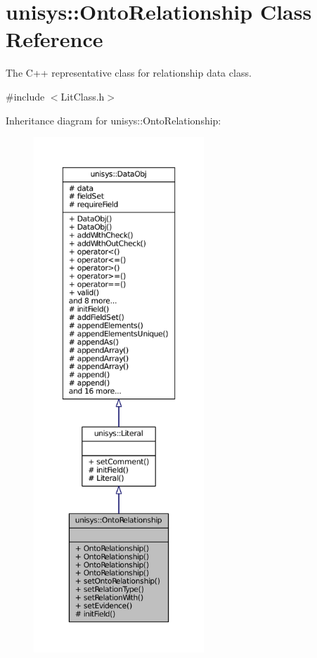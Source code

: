 \hypertarget{classunisys_1_1OntoRelationship}{\section{unisys\-:\-:Onto\-Relationship Class Reference}
\label{classunisys_1_1OntoRelationship}
}


The C++ representative class for relationship data class.  




{\ttfamily \#include $<$Lit\-Class.\-h$>$}



Inheritance diagram for unisys\-:\-:Onto\-Relationship\-:
\nopagebreak
\begin{figure}[H]
\begin{center}
\leavevmode
\includegraphics[height=550pt]{classunisys_1_1OntoRelationship__inherit__graph}
\end{center}
\end{figure}


